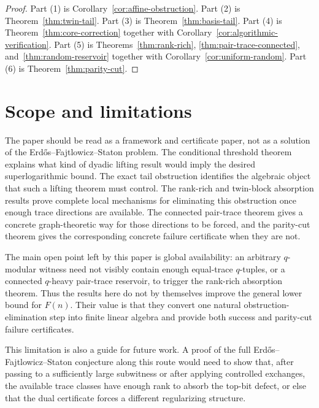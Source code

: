 \documentclass[thmsec,dntnbr,nolinenbrs]{dmgt}
\numberwithin{equation}{section}
\begin{document}
\begin{proof}
Part \textup{(1)} is Corollary~\ref{cor:affine-obstruction}.  Part \textup{(2)} is Theorem~\ref{thm:twin-tail}.  Part \textup{(3)} is Theorem~\ref{thm:basis-tail}.  Part \textup{(4)} is Theorem~\ref{thm:core-correction} together with Corollary~\ref{cor:algorithmic-verification}.  Part \textup{(5)} is Theorems~\ref{thm:rank-rich}, \ref{thm:pair-trace-connected}, and~\ref{thm:random-reservoir} together with Corollary~\ref{cor:uniform-random}.  Part \textup{(6)} is Theorem~\ref{thm:parity-cut}.
\end{proof}

\section{Scope and limitations}

The paper should be read as a framework and certificate paper, not as a solution of the Erd\H{o}s--Fajtlowicz--Staton problem.  The conditional threshold theorem explains what kind of dyadic lifting result would imply the desired superlogarithmic bound.  The exact tail obstruction identifies the algebraic object that such a lifting theorem must control.  The rank-rich and twin-block absorption results prove complete local mechanisms for eliminating this obstruction once enough trace directions are available.  The connected pair-trace theorem gives a concrete graph-theoretic way for those directions to be forced, and the parity-cut theorem gives the corresponding concrete failure certificate when they are not.

The main open point left by this paper is global availability: an arbitrary \(q\)-modular witness need not visibly contain enough equal-trace \(q\)-tuples, or a connected \(q\)-heavy pair-trace reservoir, to trigger the rank-rich absorption theorem.  Thus the results here do not by themselves improve the general lower bound for \(F(n)\).  Their value is that they convert one natural obstruction-elimination step into finite linear algebra and provide both success and parity-cut failure certificates.

This limitation is also a guide for future work.  A proof of the full Erd\H{o}s--Fajtlowicz--Staton conjecture along this route would need to show that, after passing to a sufficiently large subwitness or after applying controlled exchanges, the available trace classes have enough rank to absorb the top-bit defect, or else that the dual certificate forces a different regularizing structure.
\end{document}
